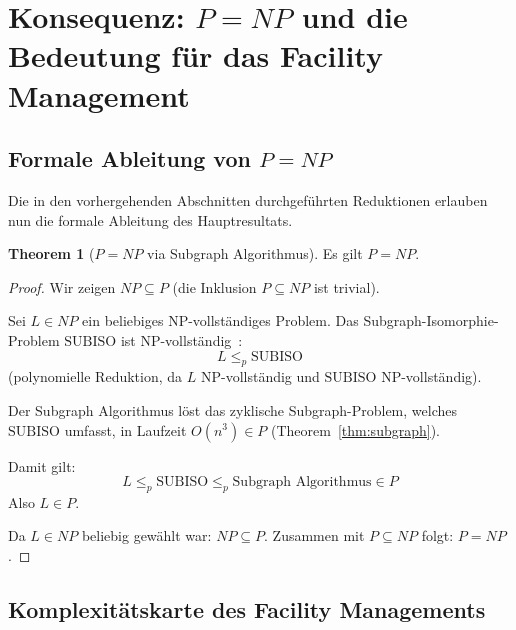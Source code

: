 ﻿\documentclass[a4paper,12pt]{article}
\theoremstyle{definition}
\newtheorem{theorem}{Theorem}[section]
\begin{document}
\section{Konsequenz: \texorpdfstring{$P = NP$}{P = NP} und die Bedeutung für das Facility Management}
\label{sec:pnp}

\subsection{Formale Ableitung von \texorpdfstring{$P = NP$}{P = NP}}

Die in den vorhergehenden Abschnitten durchgeführten Reduktionen erlauben nun
die formale Ableitung des Hauptresultats.

\begin{theorem}[$P = NP$ via Subgraph Algorithmus]
\label{thm:pnp}
Es gilt $P = NP$.
\end{theorem}

\begin{proof}
Wir zeigen $NP \subseteq P$ (die Inklusion $P \subseteq NP$ ist trivial).

Sei $L \in NP$ ein beliebiges NP-vollständiges Problem.
Das Subgraph-Isomorphie-Problem $\mathrm{SUBISO}$ ist NP-vollständig~\cite{garey1979}:
\[
    L \leq_p \mathrm{SUBISO}
\]
(polynomielle Reduktion, da $L$ NP-vollständig und $\mathrm{SUBISO}$ NP-vollständig).

Der Subgraph Algorithmus löst das zyklische Subgraph-Problem, welches
$\mathrm{SUBISO}$ umfasst, in Laufzeit $O(n^3) \in P$
(Theorem~\ref{thm:subgraph}).

Damit gilt:
\[
    L \leq_p \mathrm{SUBISO} \leq_p \text{Subgraph Algorithmus} \in P
\]
Also $L \in P$.

Da $L \in NP$ beliebig gewählt war: $NP \subseteq P$.
Zusammen mit $P \subseteq NP$ folgt: $P = NP$.
\end{proof}

\subsection{Komplexitätskarte des Facility Managements}
\end{document}
